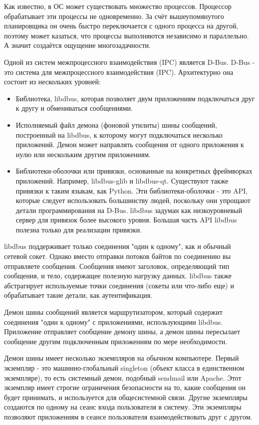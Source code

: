 \documentclass[bachelor, och, pract]{SCWorks}
\begin{document}
Как известно, в ОС может существовать множество процессов.
Процессор обрабатывает эти процессы не одновременно.
За счёт вышеупомянутого планировщика он очень быстро переключается с одного процесса на другой, поэтому может казаться, что процессы выполняются независимо и параллельно.
А значит создаётся ощущение многозадачности.

Одной из систем межпроцессного взаимодействия (IPC) является D-Bus.
D-Bus - это система для межпроцессного взаимодействия (IPC). Архитектурно она состоит из нескольких уровней:

\begin{itemize}
    \item Библиотека, libdbus, которая позволяет двум приложениям подключаться друг к другу и обмениваться сообщениями.
    \item Исполняемый файл демона (фоновой утилиты) шины сообщений, построенный на libdbus, к которому могут подключаться несколько приложений.
        Демон может направлять сообщения от одного приложения к нулю или нескольким другим приложениям.
    \item Библиотеки-оболочки или привязки, основанные на конкретных фреймворках приложений.
        Например, libdbus-glib и libdbus-qt. Существуют также привязки к таким языкам, как Python.
        Эти библиотеки-оболочки - это API, которые следует использовать большинству людей, поскольку они упрощают детали программирования на D-Bus.
        libdbus задуман как низкоуровневый сервер для привязок более высокого уровня.
        Большая часть API libdbus полезна только для реализации привязки.
\end{itemize}

libdbus поддерживает только соединения "один к одному", как и обычный сетевой сокет.
Однако вместо отправки потоков байтов по соединению вы отправляете сообщения.
Сообщения имеют заголовок, определяющий тип сообщения, и тело, содержащее полезную нагрузку данных.
libdbus также абстрагирует используемые точки соединения (сокеты или что-либо еще) и обрабатывает такие детали, как аутентификация.

Демон шины сообщений является маршрутизатором, который содержит соединения "один к одному" с приложениями, использующими libdbus.
Приложение отправляет сообщение демону шины, а демон шины пересылает сообщение другим подключенным приложениям по мере необходимости.

Демон шины имеет несколько экземпляров на обычном компьютере.
Первый экземпляр - это машинно-глобальный singleton (объект класса в единственном экземпляре), то есть системный демон, подобный sendmail или Apache.
Этот экземпляр имеет строгие ограничения безопасности на то, какие сообщения он будет принимать, и используется для общесистемной связи.
Другие экземпляры создаются по одному на сеанс входа пользователя в систему.
Эти экземпляры позволяют приложениям в сеансе пользователя взаимодействовать друг с другом.
\end{document}
